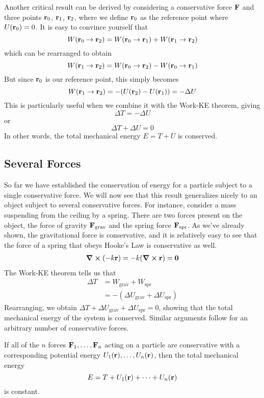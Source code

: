Another critical result can be derived by considering a conservative force $\mathbf{F}$ and three points $\mathbf{r}_0$, $\mathbf{r}_1$, $\mathbf{r}_2$, where we define $\mathbf{r}_0$ as the reference point where $U(\mathbf{r}_0) = 0$. It is easy to convince yourself that
\[ W(\mathbf{r}_0 \to \mathbf{r}_2) = W(\mathbf{r}_0 \to \mathbf{r}_1) + W(\mathbf{r}_1 \to \mathbf{r}_2) \]
which can be rearranged to obtain
\[W(\mathbf{r}_1 \to \mathbf{r}_2) = W(\mathbf{r}_0 \to \mathbf{r}_2) - W(\mathbf{r}_0 \to \mathbf{r}_1)\]
But since $\mathbf{r}_0$ is our reference point, this simply becomes
\[ W(\mathbf{r}_1 \to \mathbf{r}_2) = -(U(\mathbf{r}_2) - U(\mathbf{r}_1)) = -\Delta U \]
This is particularly useful when we combine it with the Work-KE theorem, giving
\[ \Delta T = -\Delta U\]
or
\[ \Delta T + \Delta U = 0\]
In other words, the total mechanical energy $E = T + U$ is conserved. 
\subsection*{Several Forces}
So far we have established the conservation of energy for a particle subject to a single conservative force. We will now see that this result generalizes nicely to an object subject to several conservative forces. For instance, consider a mass suspending from the ceiling by a spring. There are two forces present on the object, the force of gravity $\mathbf{F}_\text{grav}$ and the spring force $\mathbf{F}_\text{spr}$. As we've already shown, the gravitational force is conservative, and it is relatively easy to see that the force of a spring that obeys Hooke's Law is conservative as well. 
\begin{align*}
    \curl (-k\mathbf{r}) = -k (\curl{\mathbf{r}}) = \mathbf{0}  
\end{align*}
The Work-KE theorem tells us that
\begin{align*}
    \Delta T &= W_\text{grav} + W_\text{spr} \\
    &= -(\Delta U_\text{grav} + \Delta U_\text{spr})
\end{align*}
Rearranging, we obtain $\Delta T + \Delta U_\text{grav} + \Delta U_\text{spr} = 0$, showing that the total mechanical energy of the system is conserved. Similar arguments follow for an arbitrary number of conservative forces.
\begin{theorem}
    If all of the $n$ forces $\mathbf{F}_1, \dots, \mathbf{F}_n$ acting on a particle are conservative with a corresponding potential energy $U_1(\mathbf{r}), \dots, U_n(\mathbf{r}) $, then the total mechanical energy
    \[ E = T + U_1(\mathbf{r}) + \cdots + U_n(\mathbf{r}) \] 
    is constant.
\end{theorem}
